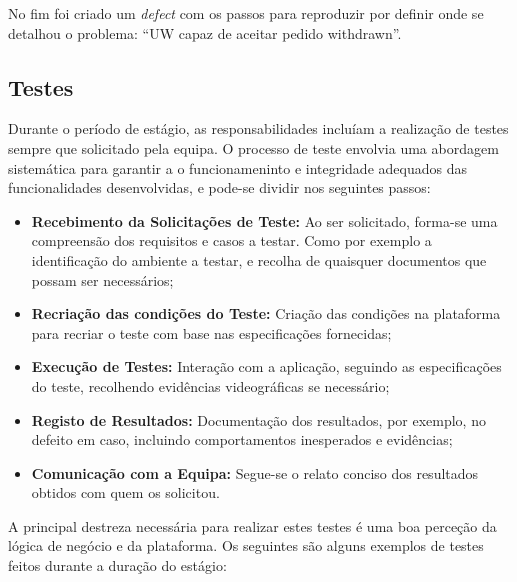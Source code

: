             No fim foi criado um \textit{defect} com os passos para reproduzir por definir onde se detalhou o problema: ``UW capaz de aceitar pedido withdrawn''.



    \subsection{Testes}\label{sub:tests}

        Durante o período de estágio, as responsabilidades incluíam a realização de testes sempre que solicitado pela equipa. O processo de teste envolvia uma abordagem sistemática para garantir a o funcionameninto e integridade adequados das funcionalidades desenvolvidas, e pode-se dividir nos seguintes passos:
        
        \begin{itemize}
            \item \textbf{Recebimento da Solicitações de Teste:} Ao ser solicitado, forma-se uma compreensão dos requisitos e casos a testar. Como por exemplo a identificação do ambiente a testar, e recolha de quaisquer documentos que possam ser necessários;
            \item \textbf{Recriação das condições do Teste:} Criação das condições na plataforma para recriar o teste com base nas especificações fornecidas;
            \item \textbf{Execução de Testes:} Interação com a aplicação, seguindo as especificações do teste, recolhendo evidências videográficas se necessário;
            \item \textbf{Registo de Resultados:} Documentação dos resultados, por exemplo, no defeito em caso, incluindo comportamentos inesperados e evidências;
            \item \textbf{Comunicação com a Equipa:} Segue-se o relato conciso dos resultados obtidos com quem os solicitou.
        \end{itemize}

        A principal destreza necessária para realizar estes testes é uma boa perceção da lógica de negócio e da plataforma. Os seguintes são alguns exemplos de testes feitos durante a duração do estágio:

